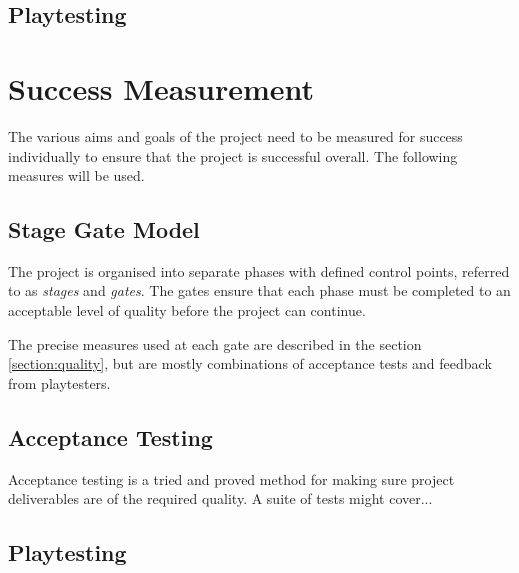 \subsection{Playtesting}



\section{Success Measurement}
\label{section:success}

The various aims and goals of the project need to be measured for success individually to ensure that the project is successful overall. The following measures will be used.

\subsection{Stage Gate Model}

The project is organised into separate phases with defined control points, referred to as \emph{stages} and \emph{gates}. The gates ensure that each phase must be completed to an acceptable level of quality before the project can continue.

The precise measures used at each gate are described in the section \ref{section:quality}, but are mostly combinations of acceptance tests and feedback from playtesters.

\subsection{Acceptance Testing}

Acceptance testing is a tried and proved method for making sure project deliverables are of the required quality. A suite of tests might cover...

\subsection{Playtesting}
